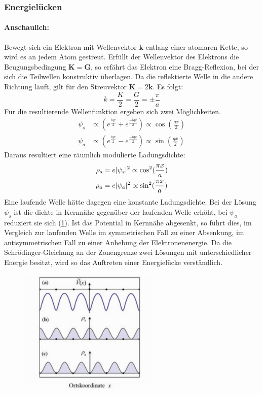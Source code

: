 \documentclass[11pt]{article}
\DeclarePairedDelimiter\abs{\lvert}{\rvert}
\begin{document}
\subsubsection{Energielücken}
\paragraph{Anschaulich:} \noindent
Bewegt sich ein Elektron mit Wellenvektor $\bm{k}$ entlang einer atomaren Kette,
so wird es an jedem Atom gestreut. Erfüllt der Wellenvektor des Elektrons die
Beugungsbedingung $\bm{K}=\bm{G}$, so erfährt das Elektron eine Bragg-Reflexion,
bei der sich die Teilwellen konstruktiv überlagen. Da die reflektierte Welle in
die andere Richtung läuft, gilt für den Streuvektor $\bm{K}=2\bm{k}$. Es folgt:
\begin{equation}
  k=\frac{K}{2}=\frac{G}{2}=\pm\frac{\pi}{a}
\end{equation}
Für die resultierende Wellenfunktion ergeben sich zwei Möglichkeiten.
\begin{equation}
  \begin{align}
  \psi_s&\propto\left(e^{\frac{igx}{2}}+e^{\frac{-igx}{2}}\right)\propto\cos\left
  (\frac{gx}{2}\right) \\
  \psi_a&\propto\left(e^{\frac{igx}{2}}-e^{\frac{-igx}{2}}\right)\propto\sin\left
  (\frac{gx}{2}\right)
  \end{align}
\end{equation}
Daraus resultiert eine räumlich modulierte Ladungsdichte:
\begin{equation}
  \begin{align}
  \rho_s &=e\abs{\psi_s}^2\propto\cos^2(\frac{\pi x}{a}) \\
  \rho_a &=e\abs{\psi_a}^2\propto\sin^2(\frac{\pi x}{a})
  \end{align}
\end{equation}
Eine laufende Welle hätte dagegen eine konstante Ladungsdichte. Bei der Lösung
$\psi_s$ ist die dichte in Kernnähe gegenüber der laufenden Welle erhöht, bei
$\psi_a$ reduziert sie sich (\ref{fig:ladungsdichte}). Ist das Potential in
Kernnähe abgesenkt, so führt dies, im Vergleich zur laufenden Welle im
symmetrischen Fall zu einer Absenkung, im antisymmetrischen Fall zu einer
Anhebung der Elektronenenergie. Da die Schrödinger-Gleichung an der Zonengrenze
zwei Lösungen mit unterschiedlicher Energie besitzt, wird so das Auftreten einer
Energielücke verständlich.
\begin{figure}[h]
\includegraphics[width=0.6\textwidth]{ladungsdichte}
\centering
\label{fig:ladungsdichte}
\end{figure}
\end{document}
